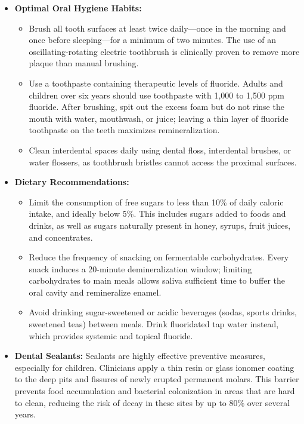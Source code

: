 \begin{itemize}
    \item \textbf{Optimal Oral Hygiene Habits:}
    \begin{itemize}
        \item Brush all tooth surfaces at least twice daily—once in the morning and once before sleeping—for a minimum of two minutes. The use of an oscillating-rotating electric toothbrush is clinically proven to remove more plaque than manual brushing.
        \item Use a toothpaste containing therapeutic levels of fluoride. Adults and children over six years should use toothpaste with 1,000 to 1,500 ppm fluoride. After brushing, spit out the excess foam but do not rinse the mouth with water, mouthwash, or juice; leaving a thin layer of fluoride toothpaste on the teeth maximizes remineralization.
        \item Clean interdental spaces daily using dental floss, interdental brushes, or water flossers, as toothbrush bristles cannot access the proximal surfaces.
    \end{itemize}
    \item \textbf{Dietary Recommendations:}
    \begin{itemize}
        \item Limit the consumption of free sugars to less than 10\% of daily caloric intake, and ideally below 5\%. This includes sugars added to foods and drinks, as well as sugars naturally present in honey, syrups, fruit juices, and concentrates.
        \item Reduce the frequency of snacking on fermentable carbohydrates. Every snack induces a 20-minute demineralization window; limiting carbohydrates to main meals allows saliva sufficient time to buffer the oral cavity and remineralize enamel.
        \item Avoid drinking sugar-sweetened or acidic beverages (sodas, sports drinks, sweetened teas) between meals. Drink fluoridated tap water instead, which provides systemic and topical fluoride.
    \end{itemize}
    \item \textbf{Dental Sealants:} Sealants are highly effective preventive measures, especially for children. Clinicians apply a thin resin or glass ionomer coating to the deep pits and fissures of newly erupted permanent molars. This barrier prevents food accumulation and bacterial colonization in areas that are hard to clean, reducing the risk of decay in these sites by up to 80\% over several years.

\end{itemize}
